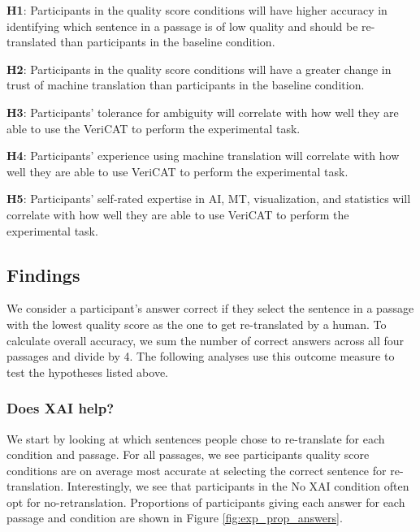 \begin{compacthang}
    \item \textbf{H1}: Participants in the quality score conditions will have higher accuracy in identifying which sentence in a passage is of low quality and should be re-translated than participants in the baseline condition. 
    \item \textbf{H2}: Participants in the quality score conditions will have a greater change in trust of machine translation than participants in the baseline condition. 
    \item \textbf{H3}: Participants’ tolerance for ambiguity will correlate with how well they are able to use the VeriCAT to perform the experimental task.
    \item \textbf{H4}: Participants’ experience using machine translation will correlate with how well they are able to use VeriCAT to perform the experimental task.
    \item \textbf{H5}: Participants’ self-rated expertise in AI, MT, visualization, and statistics will correlate with how well they are able to use VeriCAT to perform the experimental task.   
\end{compacthang}

\subsection{Findings}

We consider a participant’s answer correct if they select the sentence in a passage with the lowest quality score as the one to get re-translated by a human. To calculate overall accuracy, we sum the number of correct answers across all four passages and divide by 4. The following analyses use this outcome measure to test the hypotheses listed above.

\subsubsection{Does XAI help?}

We start by looking at which sentences people chose to re-translate for each condition and passage. For all passages, we see participants quality score conditions are on average most accurate at selecting the correct sentence for re-translation. Interestingly, we see that participants in the No XAI condition often opt for no-retranslation. Proportions of participants giving each answer for each passage and condition are shown in Figure \ref{fig:exp_prop_answers}.

